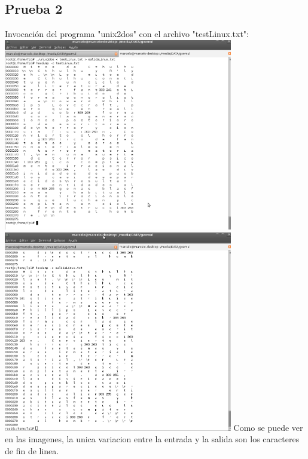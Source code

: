 \documentclass[a4paper,10pt]{article}
\begin{document}
    \subsection{Prueba 2}
    Invocaci\'on del programa "unix2dos" con el archivo "testLinux.txt":
      \newline	
      \includegraphics[width=10cm, viewport=0 0 1008 847]{Imagenes/testLinux.png}
      \newline
      \includegraphics[width=10cm, viewport=0 0 1005 882]{Imagenes/salidaLinux.png}
      \newline
Como se puede ver en las imagenes, la unica variacion entre la entrada y la salida son los caracteres de fin de linea.	
      \newline
\end{document}
